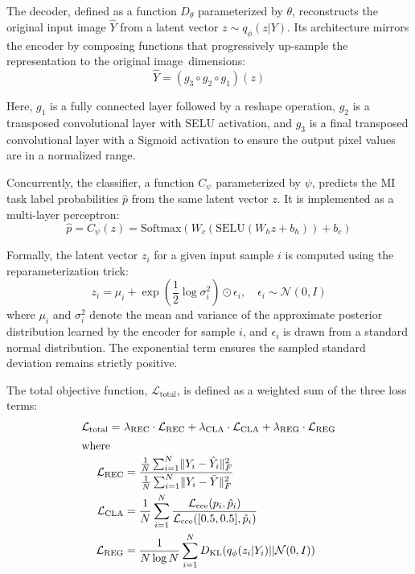 The decoder, defined as a function $D_{\theta}$ parameterized by $\theta$, reconstructs the original input image $\hat{Y}$ from a latent vector $z \sim q_{\phi}(z|Y)$. Its architecture mirrors the encoder by composing functions that progressively up-sample the representation to the original \mbox{image dimensions:}
\begin{equation}
    \hat{Y} = (g_3 \circ g_2 \circ g_1)(z)
\end{equation}

Here,
$g_1$ is a fully connected layer followed by a reshape operation, $g_2$ is a transposed convolutional layer with {SELU} activation, and $g_3$ is a final transposed convolutional layer with a Sigmoid activation to ensure the output pixel values are in a normalized range.

Concurrently, the classifier, a function $C_{\psi}$ parameterized by $\psi$, predicts the MI task label probabilities $\hat{p}$ from the same latent vector $z$. It is implemented as a multi-layer perceptron:
\begin{equation}
    \hat{p} = C_{\psi}(z) = \text{Softmax}(W_c( \text{SELU}(W_h z + b_h)) + b_c)
\end{equation}

Formally, the latent vector $z_i$ for a given input sample $i$ is computed using the reparameterization trick:
\begin{equation}
    z_i = \mu_i + \exp\left(\frac{1}{2}\log\sigma_i^2\right) \odot \epsilon_i, \quad \epsilon_i \sim \mathcal{N}(0, I)
\end{equation}
where $\mu_i$ and $\sigma_i^2$ denote the mean and variance of the approximate posterior distribution learned by the encoder for sample $i$, and $\epsilon_i$ is drawn from a standard normal distribution. The exponential term ensures the sampled standard deviation remains strictly positive.

The total objective function, $\mathcal{L}_{\text{total}}$, is defined as a weighted sum of the three loss terms:
\begin{align}
\mathcal{L}_{\text{total}} = \ & \lambda_{\text{REC}} \cdot \mathcal{L}_{\text{REC}} + \lambda_{\text{CLA}} \cdot \mathcal{L}_{\text{CLA}} + \lambda_{\text{REG}} \cdot \mathcal{L}_{\text{REG}} \\
\intertext{where}
\mathcal{L}_{\text{REC}} &= \frac{ \frac{1}{N} \sum_{i=1}^{N} \lVert Y_i - \hat{Y}_i \rVert_F^2 }{ \frac{1}{N} \sum_{i=1}^{N} \lVert Y_i - \bar{Y} \rVert_F^2 } \label{eq:rec} \\
\mathcal{L}_{\text{CLA}} &= \frac{1}{N} \sum_{i=1}^{N} \frac{ \mathcal{L}_{\mathrm{cce}}(p_i, \hat{p}_i) }{ \mathcal{L}_{\mathrm{cce}}([0.5, 0.5], \hat{p}_i)} \label{eq:cla} \\
\mathcal{L}_{\text{REG}} &= \frac{1}{N \log N} \sum_{i=1}^{N} D_{\text{KL}}(q_{\phi}(z_i|Y_i) || \mathcal{N}(0, I)) \label{eq:reg}
\end{align}

